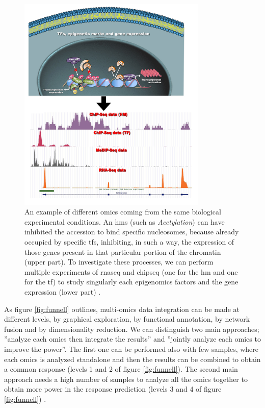 \begin{figure}[H]
\centering
\includegraphics[width=9cm, keepaspectratio]{img/intro/multiomicsex.png}
\caption[Multi-Omics Representation]{An example of different omics coming from the same biological experimental conditions. 
An \glspl{hm} (such as \textit{Acetylation}) can have inhibited the accession to bind specific nucleosomes, because already occupied by specific \glspl{tf}, inhibiting, in such a way, the expression of those genes present in that particular portion of the chromatin (upper part).
To investigate these processes, we can perform multiple experiments of \gls{rnaseq} and \gls{chipseq} (one for the \gls{hm} and one for the \gls{tf}) to study singularly each epigenomics factors and the gene expression (lower part) \cite{Angelini2014c}.}
\label{fig:omics}
\end{figure}


As figure \ref{fig:funnell} outlines, multi-omics data integration can be made at different levels, by graphical exploration, by functional annotation, by network fusion and by dimensionality reduction.
We can distinguish two main approaches; ''analyze each omics then integrate the results'' and ''jointly analyze each omics to improve the power''.
The first one can be performed also with few samples, where each omics is analyzed standalone and then the results can be combined to obtain a common response (levels 1 and 2 of figure \ref{fig:funnell}).
The second main approach needs a high number of samples to analyze all the omics together to obtain more power in the response prediction (levels 3 and 4 of figure \ref{fig:funnell}) \cite{Rohart2017, Argelaguet2018, Jia2017, Meng2016}.

